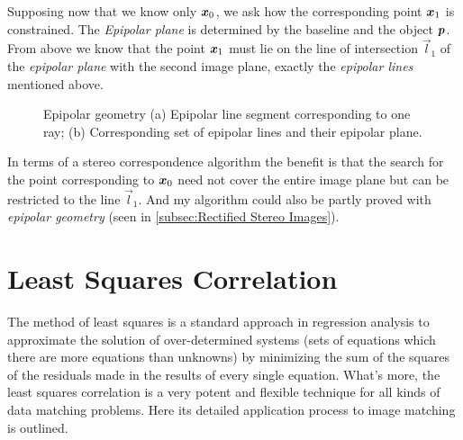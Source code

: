 Supposing now that we know only $ \boldsymbol{x}_{0}$, we ask how the corresponding point $ \boldsymbol{x}_{1}$  is constrained. The \textit{Epipolar plane} is determined by the baseline and the object $ \boldsymbol{p}$. From above we know that the point $ \boldsymbol{x}_{1}$ must lie on the line of intersection $\vec{l}_{1}$ of the \textit{epipolar plane} with the second image plane, exactly the \textit{epipolar lines} mentioned above. 
\begin{figure}[htbp]\centering
	 \qquad
	\caption{Epipolar geometry (a) Epipolar line segment corresponding to one ray; (b) Corresponding set of epipolar lines and their epipolar plane.}
	\label{fig:epipolar}
\end{figure}

In terms of a stereo correspondence algorithm the benefit is that the search for the point corresponding to $ \boldsymbol{x}_{0}$ need not cover the entire image plane but can be restricted to the line $\vec{l}_{1}$. And my algorithm could also be partly proved with \textit{epipolar geometry} (seen in \cref{subsec:Rectified Stereo Images}).

\section{Least Squares Correlation}\label{sec:Least Squares Correlation}
The method of least squares is a standard approach in regression analysis to approximate the solution of over-determined systems (sets of equations which there are more equations than unknowns) by minimizing the sum of the squares of the residuals made in the results of every single equation. What's more, the least squares correlation is a very potent and flexible technique for all kinds of data matching problems. Here its detailed application process to image matching is outlined.

